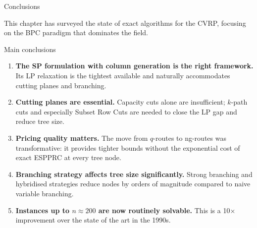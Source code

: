 \documentclass[aspectratio=169,10pt]{beamer}
\begin{document}
\begin{frame}[allowframebreaks]{Conclusions}

This chapter has surveyed the state of exact algorithms for the CVRP,
focusing on the BPC paradigm that dominates the field.

\begin{block}{Main conclusions}
\begin{enumerate}
  \item \textbf{The SP formulation with column generation is the right
        framework.} Its LP relaxation is the tightest available and
        naturally accommodates cutting planes and branching.
  \item \textbf{Cutting planes are essential.} Capacity cuts alone are
        insufficient; $k$-path cuts and especially Subset Row Cuts are
        needed to close the LP gap and reduce tree size.
  \item \textbf{Pricing quality matters.} The move from $q$-routes to
        ng-routes was transformative: it provides tighter bounds without
        the exponential cost of exact ESPPRC at every tree node.
  \item \textbf{Branching strategy affects tree size significantly.}
        Strong branching and hybridised strategies reduce nodes by
        orders of magnitude compared to naive variable branching.
  \item \textbf{Instances up to $n \approx 200$ are now routinely
        solvable.} This is a 10$\times$ improvement over the state of
        the art in the 1990s.
\end{enumerate}
\end{block}

\framebreak


\end{frame}
\end{document}
